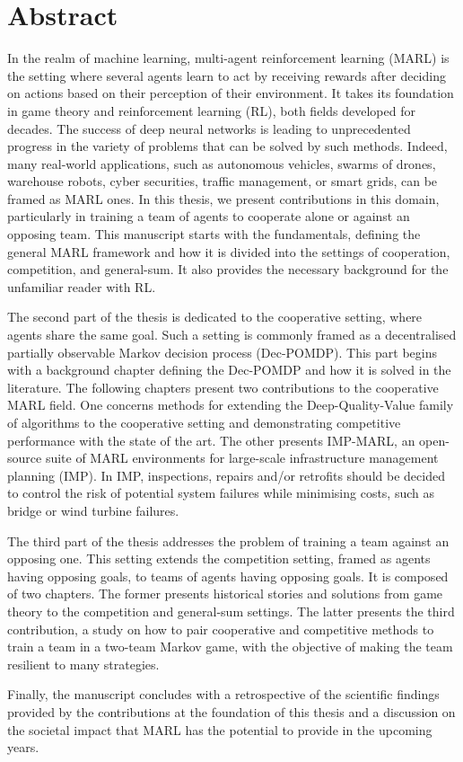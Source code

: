 
\chapter*{Abstract}

In the realm of machine learning, multi-agent reinforcement learning (MARL) is the setting where several agents learn to act by receiving rewards after deciding on actions based on their perception of their environment.
It takes its foundation in game theory and reinforcement learning (RL), both fields developed for decades.
The success of deep neural networks is leading to unprecedented progress in the variety of problems that can be solved by such methods.
Indeed, many real-world applications, such as autonomous vehicles, swarms of drones, warehouse robots, cyber securities, traffic management, or smart grids, can be framed as MARL ones.
In this thesis, we present contributions in this domain, particularly in training a team of agents to cooperate alone or against an opposing team.
This manuscript starts with the fundamentals, defining the general MARL framework and how it is divided into the settings of cooperation, competition, and general-sum.
It also provides the necessary background for the unfamiliar reader with RL.

The second part of the thesis is dedicated to the cooperative setting, where agents share the same goal.
Such a setting is commonly framed as a decentralised partially observable Markov decision process (Dec-POMDP).
This part begins with a background chapter defining the Dec-POMDP and how it is solved in the literature.
The following chapters present two contributions to the cooperative MARL field.
One concerns methods for extending the Deep-Quality-Value family of algorithms to the cooperative setting and demonstrating competitive performance with the state of the art.
The other presents IMP-MARL, an open-source suite of MARL environments for large-scale infrastructure management planning (IMP).
In IMP, inspections, repairs and/or retrofits should be decided to control the risk of potential system failures while minimising costs, such as bridge or wind turbine failures.

The third part of the thesis addresses the problem of training a team against an opposing one.
This setting extends the competition setting, framed as agents having opposing goals, to teams of agents having opposing goals.
It is composed of two chapters.
The former presents historical stories and solutions from game theory to the competition and general-sum settings.
The latter presents the third contribution, a study on how to pair cooperative and competitive methods to train a team in a two-team Markov game, with the objective of making the team resilient to many strategies.

Finally, the manuscript concludes with a retrospective of the scientific findings provided by the contributions at the foundation of this thesis and a discussion on the societal impact that MARL has the potential to provide in the upcoming years.


